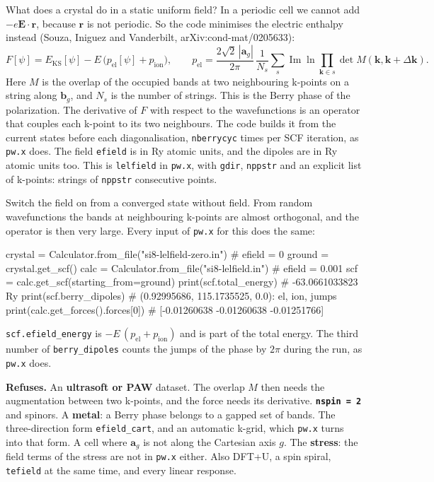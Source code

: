 \documentclass[11pt,a4paper]{article}
\newcommand{\code}[1]{\texttt{\small #1}}
\begin{document}
What does a crystal do in a static uniform field? In a periodic cell we cannot
add $-e\mathbf E\cdot\mathbf r$, because $\mathbf r$ is not periodic. So the code
minimises the electric enthalpy instead (Souza, Iniguez and Vanderbilt,
arXiv:cond-mat/0205633):
\begin{equation*}
F[\psi] = E_{\mathrm{KS}}[\psi] - E\,\big(p_{\mathrm{el}}[\psi] + p_{\mathrm{ion}}\big),
\qquad
p_{\mathrm{el}} = \frac{2\sqrt2\,|\mathbf a_g|}{2\pi}\,\frac{1}{N_s}\sum_s
\operatorname{Im}\ln\prod_{\mathbf k\in s}\det M(\mathbf k,\mathbf k+\Delta\mathbf k).
\end{equation*}
Here $M$ is the overlap of the occupied bands at two neighbouring k-points on a
string along $\mathbf b_g$, and $N_s$ is the number of strings. This is the Berry
phase of the polarization. The derivative of $F$ with respect to the
wavefunctions is an operator that couples each k-point to its two neighbours. The
code builds it from the current states before each diagonalisation,
\code{nberrycyc} times per SCF iteration, as \code{pw.x} does. The field
\code{efield} is in Ry atomic units, and the dipoles are in Ry atomic units too.
This is \code{lelfield} in \code{pw.x}, with \code{gdir}, \code{nppstr} and an
explicit list of k-points: strings of \code{nppstr} consecutive points.

Switch the field on from a converged state without field. From random
wavefunctions the bands at neighbouring k-points are almost orthogonal, and the
operator is then very large. Every input of \code{pw.x} for this does the same:
\begin{pycode}
crystal = Calculator.from_file("si8-lelfield-zero.in")   # efield = 0
ground = crystal.get_scf()
calc = Calculator.from_file("si8-lelfield.in")           # efield = 0.001
scf = calc.get_scf(starting_from=ground)
print(scf.total_energy)       # -63.0661033823 Ry
print(scf.berry_dipoles)      # (0.92995686, 115.1735525, 0.0): el, ion, jumps
print(calc.get_forces().forces[0])   # [-0.01260638 -0.01260638 -0.01251766]
\end{pycode}
\code{scf.efield\_energy} is $-E\,(p_{\mathrm{el}} + p_{\mathrm{ion}})$ and is part
of the total energy. The third number of \code{berry\_dipoles} counts the jumps of
the phase by $2\pi$ during the run, as \code{pw.x} does.

\begin{refuses}
\textbf{Refuses.} An \textbf{ultrasoft or PAW} dataset. The overlap $M$ then needs
the augmentation between two k-points, and the force needs its derivative.
\textbf{\code{nspin = 2}} and spinors. A \textbf{metal}: a Berry phase belongs to a
gapped set of bands. The three-direction form \code{efield\_cart}, and an
automatic k-grid, which \code{pw.x} turns into that form. A cell where
$\mathbf a_g$ is not along the Cartesian axis $g$. The \textbf{stress}: the field
terms of the stress are not in \code{pw.x} either. Also DFT+U, a spin spiral,
\code{tefield} at the same time, and every linear response.
\end{refuses}
\end{document}
